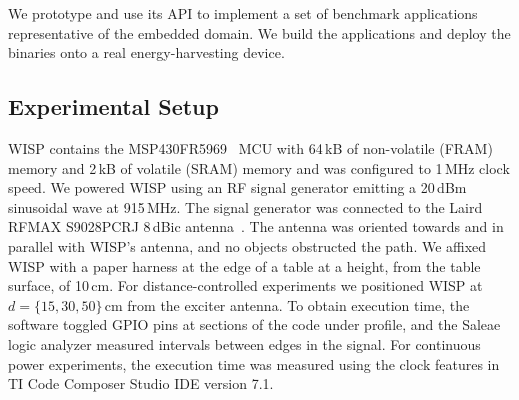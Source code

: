 We prototype \sys and use its API to implement a set of benchmark applications representative of the embedded domain. We build the applications and deploy the binaries onto a real energy-harvesting device. 


\subsection{Experimental Setup}
\label{sec:results_hardware_software}


WISP contains the MSP430FR5969~\cite{wolverine} MCU with 64\,kB of
non-volatile (FRAM) memory and 2\,kB of volatile (SRAM) memory and was
configured to 1\,MHz clock speed.
%
We powered WISP using an RF signal generator emitting a 20\,dBm sinusoidal wave at 915\,MHz.
The signal generator was connected to the Laird RFMAX S9028PCRJ 8\,dBic
antenna~\cite{atlas2015}.
%
The antenna was oriented towards and in parallel with WISP's antenna, and
no objects obstructed the path.
%
We affixed WISP with a paper harness at the edge of a table at a height, from the table surface, of 10\,cm.
%
For distance-controlled experiments we positioned WISP at $d=\{15, 30,
50\}$\,cm from the exciter antenna.
%
%
To obtain execution time, the software toggled GPIO pins at sections of the code
under profile, and the Saleae~\cite{saleae} logic analyzer measured
intervals between edges in the signal. For continuous power experiments, the 
execution time was measured using the clock features in TI Code Composer Studio IDE version 7.1.
%
